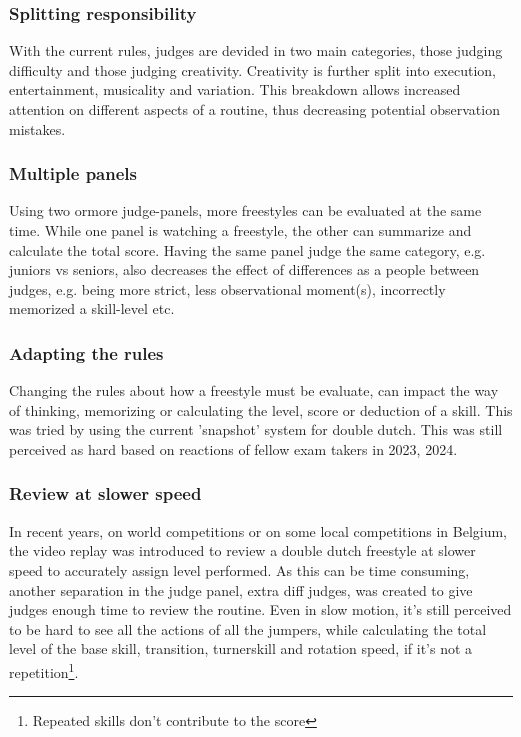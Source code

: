 \subsubsection{Splitting responsibility}
With the current rules, judges are devided in two main categories, those judging difficulty and those judging creativity. Creativity is further split into execution, entertainment, musicality and variation. This breakdown allows increased attention on different aspects of a routine, thus decreasing potential observation mistakes.

\subsubsection{Multiple panels}
Using two ormore judge-panels, more freestyles can be evaluated at the same time. While one
panel is watching a freestyle, the other can summarize and calculate the total score. Having the same panel judge the same category, e.g. juniors vs seniors, also decreases the effect of differences as a people between judges, e.g. being more strict, less observational moment(s), incorrectly memorized a skill-level etc.

\subsubsection{Adapting the rules}
Changing the rules about how a freestyle must be evaluate, can impact the way of thinking, memorizing or calculating the level, score or deduction of a skill. This was tried by using the current 'snapshot' system for double dutch. This was still perceived as hard based on reactions of fellow exam takers in 2023, 2024.

\subsubsection{Review at slower speed}
In recent years, on world competitions or on some local competitions in Belgium, the video
replay was introduced to review a double dutch freestyle at slower speed to accurately assign level performed.
As this can be time consuming, another separation in the judge panel, extra diff
judges, was created to give judges enough time to review the routine. Even in slow motion, it’s still perceived to be hard to see all the actions of all the jumpers, while calculating the total level of the base skill, transition, turnerskill and rotation speed, if it's not a repetition\footnote{Repeated skills don't contribute to the score}.

